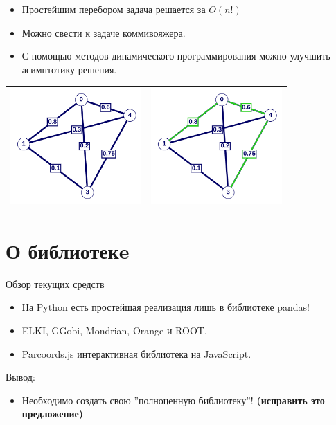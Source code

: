 \documentclass[fleqn, xcolor=x11names]{beamer}
\begin{document}
\begin{frame}{}

    \begin{itemize}
        \item Простейшим перебором задача решается за $O(n!)$
        \item Можно свести к задаче коммивояжера.
        \item С помощью методов динамического программирования можно улучшить асимптотику решения.
    \end{itemize}

    \vspace{10px}

    \begin{tabular}{cc}
        \centering
        \includegraphics[width=5cm]{graph_example_1.png} &
        \includegraphics[width=5cm]{graph_example_2.png}   \\
    \end{tabular}
\end{frame}

\section{О библиотекe}

\begin{frame}{Обзор текущих средств}
    \begin{itemize}
        \item На Python есть простейшая реализация лишь в библиотеке pandas!
        \item ELKI, GGobi, Mondrian, Orange и ROOT.
        \item Parcoords.js интерактивная библиотека на JavaScript.
\end{itemize}

    \vspace{30px}
    Вывод:
    \begin{itemize}
        \item Необходимо создать свою ''полноценную библиотеку''! \textbf{(исправить это предложение)}
    \end{itemize}

\end{frame}
\end{document}
